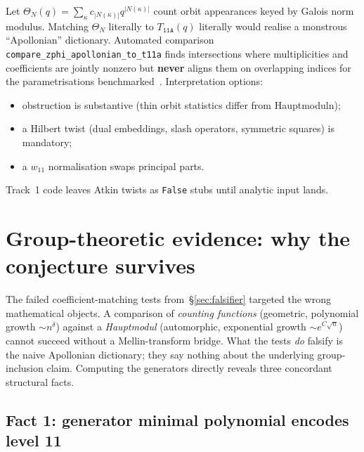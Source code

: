 \documentclass[11pt,a4paper]{article}
\theoremstyle{plain}
\theoremstyle{definition}
\theoremstyle{remark}
\numberwithin{equation}{section}
\begin{document}
Let $\Theta_{N}(q)=\sum_{\kappa}c_{|N(\kappa)|}q^{|N(\kappa)|}$ count orbit
appearances keyed by Galois norm modulus. Matching $\Theta_{N}$ literally to
$T_{\texttt{11A}}(q)$ literally would realise a monstrous
``Apollonian'' dictionary. Automated comparison
\texttt{compare\_zphi\_apollonian\_to\_t11a}
finds intersections where multiplicities and coefficients are jointly nonzero but
\textbf{never} aligns them on overlapping indices for the parametrisations
benchmarked~\cite{fals-tests}. Interpretation options:
\begin{itemize}
\item obstruction is substantive (thin orbit statistics differ from Hauptmoduln);
\item a Hilbert twist (dual embeddings, slash operators, symmetric squares) is mandatory;
\item a $w_{11}$ normalisation swaps principal parts.
\end{itemize}
Track~1 code leaves Atkin twists as \texttt{False} stubs until analytic input lands.

\section{Group-theoretic evidence: why the conjecture survives}
\label{sec:group-evidence}

The failed coefficient-matching tests from~\S\ref{sec:falsifier} targeted the wrong mathematical objects.
A comparison of \emph{counting functions} (geometric, polynomial growth $\sim n^\delta$)
against a \emph{Hauptmodul} (automorphic, exponential growth $\sim e^{C\sqrt{n}}$)
cannot succeed without a Mellin-transform bridge.
What the tests \emph{do} falsify is the naive Apollonian dictionary; they say nothing about
the underlying group-inclusion claim.  Computing the generators directly reveals three
concordant structural facts.

\subsection*{Fact 1: generator minimal polynomial encodes level 11}
\end{document}
